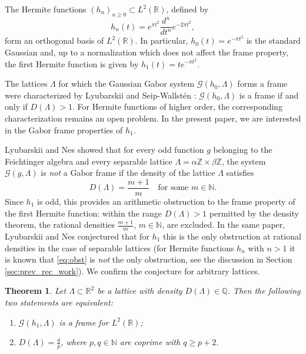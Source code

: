 \documentclass[reqno,a4paper,12pt]{amsart}
\numberwithin{equation}{section}
\newtheorem{theorem}[definition]{Theorem}
\newcommand{\N}{\mathbb N}
\newcommand{\Z}{\mathbb Z}
\newcommand{\R}{\mathbb R}
\newcommand{\Q}{\mathbb Q}
\newcommand{\calG}{\mathcal G}
\begin{document}
The Hermite functions $(h_n)_{n\geq 0} \subset L^2(\R)$, defined by
\begin{equation}
    h_n(t) = e^{\pi t^2} \frac{d^n}{dt^n}e^{-2\pi t^2},
\end{equation}
form an orthogonal basis of $L^2(\R)$. In particular, $h_0(t)=e^{-\pi t^2}$ is the standard Gaussian and, up to a normalization which does not affect the frame property, the first Hermite function is given by $h_1(t)=t e^{-\pi t^2}$.

The lattices $\Lambda$ for which the Gaussian Gabor system $\calG(h_0,\Lambda)$ forms a frame were characterized by Lyubarskii \cite{Lyubarskii1992} and Seip-Wallst\'en \cite{Seip1992,SeipWallsten1992}: $\calG(h_0,\Lambda)$ is a frame if and only if $D(\Lambda)>1$. For Hermite functions of higher order, the corresponding characterization remains an open problem. In the present paper, we are interested in the Gabor frame properties of $h_1$.

Lyubarskii and Nes \cite{lyubarskii2013gabor} showed that for every odd function $g$ belonging to the Feichtinger algebra and every separable lattice $\Lambda = \alpha\Z\times\beta\Z$, the system $\calG(g,\Lambda)$ is \emph{not} a Gabor frame if the density of the lattice $\Lambda$ satisfies
\begin{equation}\label{eq:obst}
    D(\Lambda) = \frac{m+1}{m} \quad \text{for some } m\in \N.
\end{equation}
Since $h_1$ is odd, this provides an arithmetic obstruction to the frame property of the first Hermite function: within the range $D(\Lambda)>1$ permitted by the density theorem, the rational densities $\frac{m+1}{m}$, $m\in \N$, are excluded. In the same paper, Lyubarskii and Nes conjectured that for $h_1$ this is the only obstruction at rational densities in the case of separable lattices (for Hermite functions $h_n$ with $n>1$ it is known that \eqref{eq:obst} is \emph{not} the only obstruction, see the discussion in Section \ref{sec:prev_rec_work}). We confirm the conjecture for arbitrary lattices.

\begin{theorem}\label{thm:main-intro}
Let $\Lambda \subset \R^2$ be a lattice with density $D(\Lambda) \in \Q$. Then the following two statements are equivalent:
\begin{enumerate}
    \item $\calG(h_1,\Lambda)$ is a frame for $L^2(\R)$;
    \item $D(\Lambda) = \frac qp$, where $p,q \in \N$ are coprime with $q\ge p+2$.
\end{enumerate}
\end{theorem}
\end{document}
